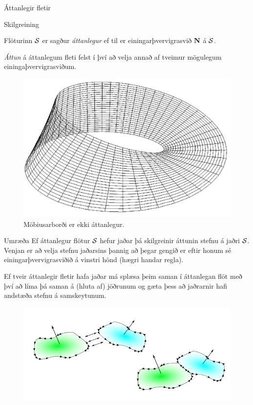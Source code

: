 \begin{frame}{Áttanlegir fletir} 

\begin {block}{Skilgreining \rtask{}}

Flöturinn $\cal S$ er sagður {\em áttanlegur} ef til er einingarþvervigrasvið
$\mbox{${\bf N}$}$ á $\cal S$.  

\medskip
{\em Áttun} á áttanlegum fleti felst í því að velja annað af tveimur
mögulegum einingaþvervigrasviðum. 

\end{block}
\begin {figure}[h!]
 \centering
            \includegraphics[width=0.40\linewidth]{mobius.png}
            \caption*{Möbiusarborði er ekki áttanlegur.}
\end {figure}
\end{frame}

\begin {frame}{}
 \begin {block}{Umræða \rtask{}}
  Ef áttanlegur flötur $\cal S$ hefur jaðar þá skilgreinir áttunin stefnu á jaðri $\cal S$. Venjan er að velja stefnu jaðarsins þannig að þegar gengið er eftir honum sé einingarþvervigrasviðið á vinstri hönd (hægri handar regla).
  
  \bigskip
  Ef tveir áttanlegir fletir hafa jaðar má splæsa þeim saman í áttanlegan flöt með því að líma þá saman á (hluta af) jöðrunum og gæta þess að jaðrarnir hafi andstæða stefnu á samskeytunum.
 \end {block}

\begin {figure}[h!]
 \centering
            \includegraphics[width=0.95\linewidth]{joinsurf.png}
            \caption*{}
\end {figure}
\end {frame}

